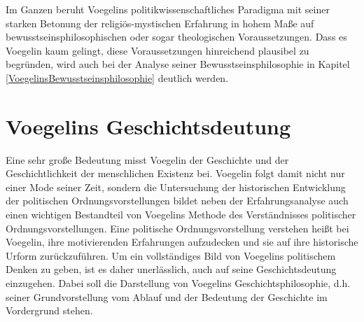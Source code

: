 Im Ganzen beruht Voegelins politikwissenschaftliches Paradigma mit seiner
starken Betonung der religiös-mystischen Erfahrung in hohem Maße auf
bewusstseinsphilosophischen oder sogar theologischen Voraussetzungen. Dass es
Voegelin kaum gelingt, diese Voraussetzungen hinreichend plausibel zu
begründen, wird auch bei der Analyse seiner Bewusstseinsphilosophie in Kapitel
\ref{VoegelinsBewusstseinsphilosophie} deutlich werden.

\section{Voegelins Geschichtsdeutung}

Eine sehr große Bedeutung misst Voegelin der Geschichte und der
Geschichtlichkeit der menschlichen Existenz bei. Voegelin folgt damit nicht
nur einer Mode seiner Zeit, sondern die Untersuchung der historischen
Entwicklung der politischen Ordnungsvorstellungen bildet neben der
Erfahrungsanalyse auch einen wichtigen Bestandteil von Voegelins Methode
des Verständnisses politischer Ordnungsvorstellungen. Eine politische
Ordnungsvorstellung verstehen heißt bei Voegelin, ihre motivierenden
Erfahrungen aufzudecken und sie auf ihre historische Urform zurückzuführen. Um
ein vollständiges Bild von Voegelins politischem Denken zu geben, ist es daher
unerlässlich, auch auf seine Geschichtsdeutung einzugehen. Dabei soll die
Darstellung von Voegelins Geschichtsphilosophie, d.h. seiner Grundvorstellung
vom Ablauf und der Bedeutung der Geschichte im Vordergrund stehen.

